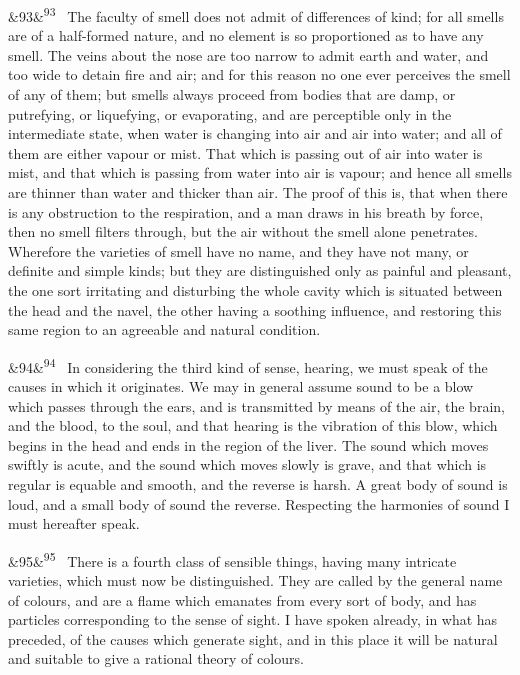 \documentclass[12pt]{article}
\newcommand{\para}[1][]{\par\noindent\ifx&#1&\else\textsuperscript{\footnotesize #1}~\fi}
\begin{document}
\para[93] The faculty of smell does not admit of differences of kind; for all smells are of a half-formed nature, and no element is so proportioned as to have any smell. The veins about the nose are too narrow to admit earth and water, and too wide to detain fire and air; and for this reason no one ever perceives the smell of any of them; but smells always proceed from bodies that are damp, or putrefying, or liquefying, or evaporating, and are perceptible only in the intermediate state, when water is changing into air and air into water; and all of them are either vapour or mist. That which is passing out of air into water is mist, and that which is passing from water into air is vapour; and hence all smells are thinner than water and thicker than air. The proof of this is, that when there is any obstruction to the respiration, and a man draws in his breath by force, then no smell filters through, but the air without the smell alone penetrates. Wherefore the varieties of smell have no name, and they have not many, or definite and simple kinds; but they are distinguished only as painful and pleasant, the one sort irritating and disturbing the whole cavity which is situated between the head and the navel, the other having a soothing influence, and restoring this same region to an agreeable and natural condition.

\para[94] In considering the third kind of sense, hearing, we must speak of the causes in which it originates. We may in general assume sound to be a blow which passes through the ears, and is transmitted by means of the air, the brain, and the blood, to the soul, and that hearing is the vibration of this blow, which begins in the head and ends in the region of the liver. The sound which moves swiftly is acute, and the sound which moves slowly is grave, and that which is regular is equable and smooth, and the reverse is harsh. A great body of sound is loud, and a small body of sound the reverse. Respecting the harmonies of sound I must hereafter speak.

\para[95] There is a fourth class of sensible things, having many intricate varieties, which must now be distinguished. They are called by the general name of colours, and are a flame which emanates from every sort of body, and has particles corresponding to the sense of sight. I have spoken already, in what has preceded, of the causes which generate sight, and in this place it will be natural and suitable to give a rational theory of colours.
\end{document}
